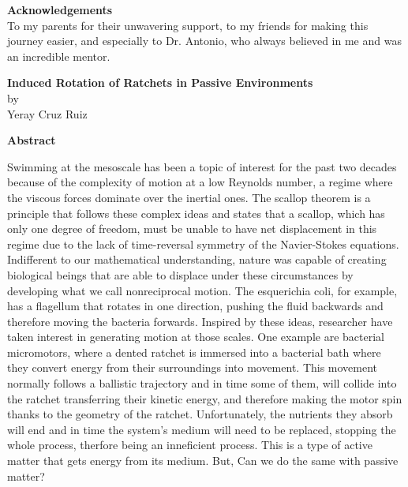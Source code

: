 \newpage %
\Huge {\bf Acknowledgements} \\
\vfill
\normalsize To my parents for their unwavering support, to my friends for making this journey easier, and especially to Dr. Antonio, who always believed in me and was an incredible mentor. 
\vfill

\vspace{5em}

\newpage %
\begin{center}
  \large {{\bf Induced Rotation of Ratchets in Passive Environments}\\
  by\\
Yeray Cruz Ruiz}
\end{center}
\Huge{{\bf Abstract}} \\
\normalsize
\vspace*{0em}

Swimming at the mesoscale has been a topic of interest for the past two decades because of the complexity of motion at a low Reynolds number, a regime where the viscous forces dominate over the inertial ones. The scallop theorem is a principle that follows these complex ideas and states that a scallop, which has only one degree of freedom, must be unable to have net displacement in this regime due to the lack of time-reversal symmetry of the Navier-Stokes equations. Indifferent to our mathematical understanding, nature was capable of creating biological beings that are able to displace under these circumstances by developing what we call nonreciprocal motion. The esquerichia coli, for example, has a flagellum that rotates in one direction, pushing the fluid backwards and therefore moving the bacteria forwards. Inspired by these ideas, researcher have taken interest in generating motion at those scales. One example are bacterial micromotors, where a dented ratchet is immersed into a bacterial bath where they convert energy from their surroundings into movement. This movement normally follows a ballistic trajectory and in time some of them, will collide into the ratchet transferring their kinetic energy, and therefore making the motor spin thanks to the geometry of the ratchet. Unfortunately, the nutrients they absorb will end and in time the system's medium will need to be replaced, stopping the whole process, therfore being an inneficient process. This is a type of active matter that gets energy from its medium. But, Can we do the same with passive matter?

